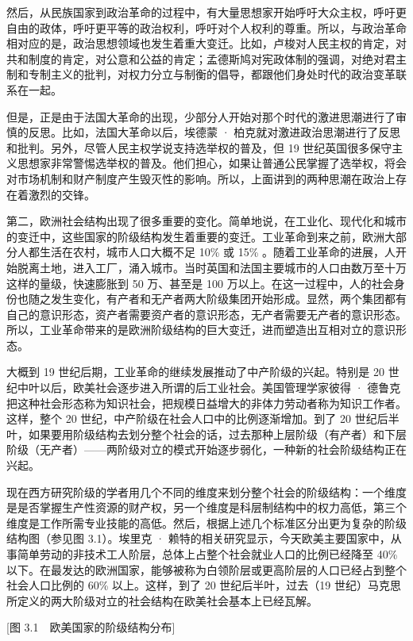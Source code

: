 然后，从民族国家到政治革命的过程中，有大量思想家开始呼吁大众主权，呼吁更自由的政体，呼吁更平等的政治权利，呼吁对个人权利的尊重。所以，与政治革命相对应的是，政治思想领域也发生着重大变迁。比如，卢梭对人民主权的肯定，对共和制度的肯定，对公意和公益的肯定；孟德斯鸠对宪政体制的强调，对绝对君主制和专制主义的批判，对权力分立与制衡的倡导，都跟他们身处时代的政治变革联系在一起。

但是，正是由于法国大革命的出现，少部分人开始对那个时代的激进思潮进行了审慎的反思。比如，法国大革命以后，埃德蒙 · 柏克就对激进政治思潮进行了反思和批判。另外，尽管人民主权学说支持选举权的普及，但 19 世纪英国很多保守主义思想家非常警惕选举权的普及。他们担心，如果让普通公民掌握了选举权，将会对市场机制和财产制度产生毁灭性的影响。所以，上面讲到的两种思潮在政治上存在着激烈的交锋。

第二，欧洲社会结构出现了很多重要的变化。简单地说，在工业化、现代化和城市的变迁中，这些国家的阶级结构发生着重要的变迁。工业革命到来之前，欧洲大部分人都生活在农村，城市人口大概不足 10\% 或 15\% 。随着工业革命的进展，人开始脱离土地，进入工厂，涌入城市。当时英国和法国主要城市的人口由数万至十万这样的量级，快速膨胀到 50 万、甚至是 100 万以上。在这一过程中，人的社会身份也随之发生变化，有产者和无产者两大阶级集团开始形成。显然，两个集团都有自己的意识形态，资产者需要资产者的意识形态，无产者需要无产者的意识形态。所以，工业革命带来的是欧洲阶级结构的巨大变迁，进而塑造出互相对立的意识形态。

大概到 19 世纪后期，工业革命的继续发展推动了中产阶级的兴起。特别是 20 世纪中叶以后，欧美社会逐步进入所谓的后工业社会。美国管理学家彼得 · 德鲁克把这种社会形态称为知识社会，把规模日益增大的非体力劳动者称为知识工作者。这样，整个 20 世纪，中产阶级在社会人口中的比例逐渐增加。到了 20 世纪后半叶，如果要用阶级结构去划分整个社会的话，过去那种上层阶级（有产者）和下层阶级（无产者）——两阶级对立的模式开始逐步弱化，一种新的社会阶级结构正在兴起。

现在西方研究阶级的学者用几个不同的维度来划分整个社会的阶级结构：一个维度是是否掌握生产性资源的财产权，另一个维度是科层制结构中的权力高低，第三个维度是工作所需专业技能的高低。然后，根据上述几个标准区分出更为复杂的阶级结构图（参见图 3.1）。埃里克 · 赖特的相关研究显示，今天欧美主要国家中，从事简单劳动的非技术工人阶层，总体上占整个社会就业人口的比例已经降至 40\% 以下。在最发达的欧洲国家，能够被称为白领阶层或更高阶层的人口已经占到整个社会人口比例的 60\% 以上。这样，到了 20 世纪后半叶，过去（19 世纪）马克思所定义的两大阶级对立的社会结构在欧美社会基本上已经瓦解。

[图 3.1　欧美国家的阶级结构分布]


